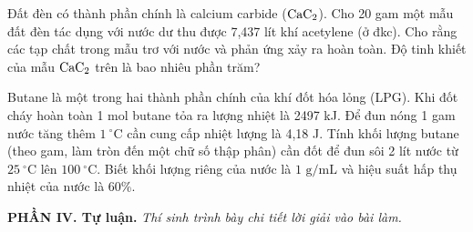 \documentclass[12pt,a4paper]{article}
\begin{document}
\begin{ex}
Đất đèn có thành phần chính là calcium carbide ($\ce{CaC2}$). Cho 20 gam một mẫu đất đèn tác dụng với nước dư thu được 7,437 lít khí acetylene (ở đkc). Cho rằng các tạp chất trong mẫu trơ với nước và phản ứng xảy ra hoàn toàn. Độ tinh khiết của mẫu $\ce{CaC2}$ trên là bao nhiêu phần trăm?
\end{ex}

\begin{ex}
Butane là một trong hai thành phần chính của khí đốt hóa lỏng (LPG). Khi đốt cháy hoàn toàn 1 mol butane tỏa ra lượng nhiệt là 2497 kJ. Để đun nóng 1 gam nước tăng thêm $1\ ^\circ\text{C}$ cần cung cấp nhiệt lượng là 4,18 J. Tính khối lượng butane (theo gam, làm tròn đến một chữ số thập phân) cần đốt để đun sôi 2 lít nước từ $25\ ^\circ\text{C}$ lên $100\ ^\circ\text{C}$. Biết khối lượng riêng của nước là $1\text{ g/mL}$ và hiệu suất hấp thụ nhiệt của nước là 60\%.
\end{ex}

\vspace{0.3cm}
\noindent\textbf{\large PHẦN IV. Tự luận.}
\textit{Thí sinh trình bày chi tiết lời giải vào bài làm.}
\vspace{0.2cm}
\end{document}
